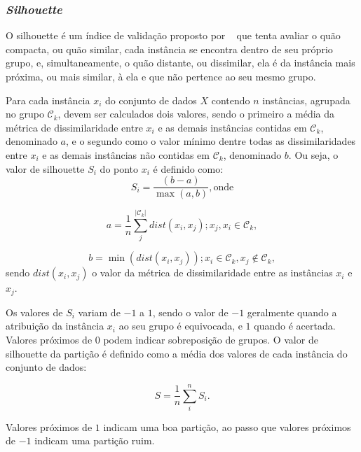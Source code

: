 \subsubsection{\emph{Silhouette}}

O silhouette é um índice de validação proposto por ~\parencite{Rousseeuw:1987:SGA:38768.38772} que tenta avaliar o quão compacta, ou quão similar, cada instância se encontra dentro de seu próprio grupo, e, simultaneamente, o quão distante, ou dissimilar, ela é da instância mais próxima, ou mais similar, à ela e que não pertence ao seu mesmo grupo.

Para cada instância $x_i$ do conjunto de dados $X$ contendo $n$ instâncias, agrupada no grupo $\mathcal{C}_k$, devem ser calculados dois valores, sendo o primeiro a média da métrica de dissimilaridade entre $x_i$ e as demais instâncias contidas em $\mathcal{C}_k$, denominado $a$, e o segundo como o valor mínimo dentre todas as dissimilaridades entre $x_i$ e as demais instâncias não contidas em $\mathcal{C}_k$, denominado $b$. Ou seja, o valor de silhouette $S_i$ do ponto $x_i$ é definido como:
\begin{equation}
S_i = \frac{(b-a)}{\max(a,b)}, \mathrm{onde}
\end{equation}

\begin{equation}
a = \frac{1}{n} \sum_{j}^{|\mathcal{C}_k|} dist(x_i,x_j); x_j, x_i \in \mathcal{C}_k,
\end{equation}

\begin{equation}
b =\min(dist(x_i,x_j)); x_i \in \mathcal{C}_k,  x_j \notin \mathcal{C}_k,
\end{equation}
sendo $dist(x_i,x_j)$ o valor da métrica de dissimilaridade entre as instâncias $x_i$ e $x_j$.

Os valores de $S_i$ variam de $-1$ a $1$, sendo o valor de $-1$ geralmente quando a atribuição da instância $x_i$ ao seu grupo é equivocada, e $1$ quando é acertada. Valores próximos de $0$ podem indicar sobreposição de grupos. O valor de silhouette da partição é definido como a média dos valores de cada instância do conjunto de dados:

\begin{equation}
S = \frac{1}{n} \sum_{i}^{n} S_i.
\end{equation}

Valores próximos de $1$ indicam uma boa partição, ao passo que valores próximos de $-1$ indicam uma partição ruim.

